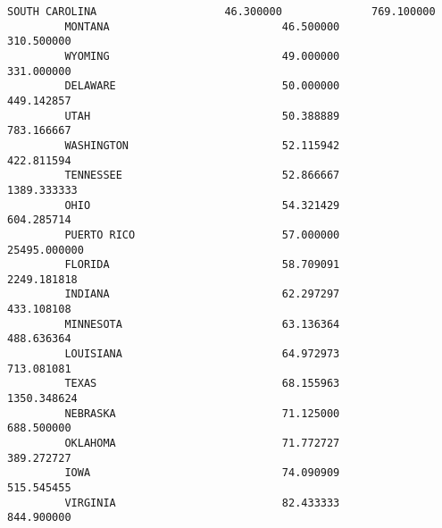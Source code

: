 \documentclass[11pt]{article}
\begin{document}
\begin{Verbatim}[commandchars=\\\{\}]
         SOUTH CAROLINA                    46.300000              769.100000   
         MONTANA                           46.500000              310.500000   
         WYOMING                           49.000000              331.000000   
         DELAWARE                          50.000000              449.142857   
         UTAH                              50.388889              783.166667   
         WASHINGTON                        52.115942              422.811594   
         TENNESSEE                         52.866667             1389.333333   
         OHIO                              54.321429              604.285714   
         PUERTO RICO                       57.000000            25495.000000   
         FLORIDA                           58.709091             2249.181818   
         INDIANA                           62.297297              433.108108   
         MINNESOTA                         63.136364              488.636364   
         LOUISIANA                         64.972973              713.081081   
         TEXAS                             68.155963             1350.348624   
         NEBRASKA                          71.125000              688.500000   
         OKLAHOMA                          71.772727              389.272727   
         IOWA                              74.090909              515.545455   
         VIRGINIA                          82.433333              844.900000   
         

\end{Verbatim}
\end{document}
